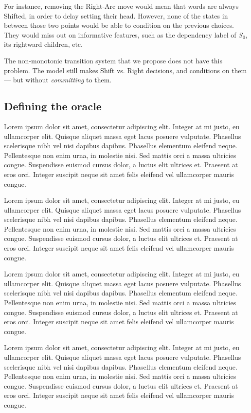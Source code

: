 \documentclass[11pt,letterpaper]{article}
\begin{document}
For instance, removing the Right-Arc move would mean that words are always Shifted,
in order to delay setting their head. However, none of the states in between those two
points would be able to condition on the previous choices. They would miss out on
informative features, such as the 
dependency label of $S_0$, its rightward children, etc.

The non-monotonic transition system that we propose does not have this problem.
The model still makes Shift vs. Right decisions, and conditions on them --- but
without \emph{committing} to them.

\subsection{Defining the oracle}

Lorem ipsum dolor sit amet, consectetur adipiscing elit. Integer at mi justo, eu ullamcorper elit. Quisque aliquet massa eget lacus posuere vulputate. Phasellus scelerisque nibh vel nisi dapibus dapibus. Phasellus elementum eleifend neque. Pellentesque non enim urna, in molestie nisi. Sed mattis orci a massa ultricies congue. Suspendisse euismod cursus dolor, a luctus elit ultrices et. Praesent at eros orci. Integer suscipit neque sit amet felis eleifend vel ullamcorper mauris congue.

Lorem ipsum dolor sit amet, consectetur adipiscing elit. Integer at mi justo, eu ullamcorper elit. Quisque aliquet massa eget lacus posuere vulputate. Phasellus scelerisque nibh vel nisi dapibus dapibus. Phasellus elementum eleifend neque. Pellentesque non enim urna, in molestie nisi. Sed mattis orci a massa ultricies congue. Suspendisse euismod cursus dolor, a luctus elit ultrices et. Praesent at eros orci. Integer suscipit neque sit amet felis eleifend vel ullamcorper mauris congue.

Lorem ipsum dolor sit amet, consectetur adipiscing elit. Integer at mi justo, eu ullamcorper elit. Quisque aliquet massa eget lacus posuere vulputate. Phasellus scelerisque nibh vel nisi dapibus dapibus. Phasellus elementum eleifend neque. Pellentesque non enim urna, in molestie nisi. Sed mattis orci a massa ultricies congue. Suspendisse euismod cursus dolor, a luctus elit ultrices et. Praesent at eros orci. Integer suscipit neque sit amet felis eleifend vel ullamcorper mauris congue.


Lorem ipsum dolor sit amet, consectetur adipiscing elit. Integer at mi justo, eu ullamcorper elit. Quisque aliquet massa eget lacus posuere vulputate. Phasellus scelerisque nibh vel nisi dapibus dapibus. Phasellus elementum eleifend neque. Pellentesque non enim urna, in molestie nisi. Sed mattis orci a massa ultricies congue. Suspendisse euismod cursus dolor, a luctus elit ultrices et. Praesent at eros orci. Integer suscipit neque sit amet felis eleifend vel ullamcorper mauris congue.
\end{document}
